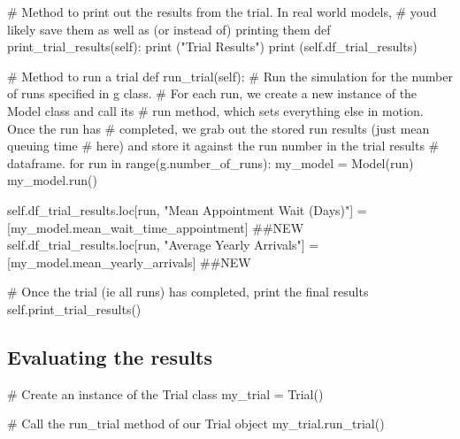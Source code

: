 \documentclass[
  letterpaper,
  DIV=11,
  numbers=noendperiod]{scrreprt}
\newenvironment{Shaded}{\begin{snugshade}}{\end{snugshade}}
\newcommand{\BuiltInTok}[1]{\textcolor[rgb]{0.00,0.23,0.31}{#1}}
\newcommand{\CommentTok}[1]{\textcolor[rgb]{0.37,0.37,0.37}{#1}}
\newcommand{\ControlFlowTok}[1]{\textcolor[rgb]{0.00,0.23,0.31}{#1}}
\newcommand{\KeywordTok}[1]{\textcolor[rgb]{0.00,0.23,0.31}{#1}}
\newcommand{\NormalTok}[1]{\textcolor[rgb]{0.00,0.23,0.31}{#1}}
\newcommand{\OperatorTok}[1]{\textcolor[rgb]{0.37,0.37,0.37}{#1}}
\newcommand{\StringTok}[1]{\textcolor[rgb]{0.13,0.47,0.30}{#1}}
\newcommand{\VariableTok}[1]{\textcolor[rgb]{0.07,0.07,0.07}{#1}}
\begin{document}
\begin{tcolorbox}
\begin{Shaded}
\begin{Highlighting}[]
    \CommentTok{\# Method to print out the results from the trial.  In real world models,}
    \CommentTok{\# you\textquotesingle{}d likely save them as well as (or instead of) printing them}
    \KeywordTok{def}\NormalTok{ print\_trial\_results(}\VariableTok{self}\NormalTok{):}
        \BuiltInTok{print}\NormalTok{ (}\StringTok{"Trial Results"}\NormalTok{)}
        \BuiltInTok{print}\NormalTok{ (}\VariableTok{self}\NormalTok{.df\_trial\_results)}

    \CommentTok{\# Method to run a trial}
    \KeywordTok{def}\NormalTok{ run\_trial(}\VariableTok{self}\NormalTok{):}
        \CommentTok{\# Run the simulation for the number of runs specified in g class.}
        \CommentTok{\# For each run, we create a new instance of the Model class and call its}
        \CommentTok{\# run method, which sets everything else in motion.  Once the run has}
        \CommentTok{\# completed, we grab out the stored run results (just mean queuing time}
        \CommentTok{\# here) and store it against the run number in the trial results}
        \CommentTok{\# dataframe.}
        \ControlFlowTok{for}\NormalTok{ run }\KeywordTok{in} \BuiltInTok{range}\NormalTok{(g.number\_of\_runs):}
\NormalTok{            my\_model }\OperatorTok{=}\NormalTok{ Model(run)}
\NormalTok{            my\_model.run()}

            \VariableTok{self}\NormalTok{.df\_trial\_results.loc[run, }\StringTok{"Mean Appointment Wait (Days)"}\NormalTok{] }\OperatorTok{=}\NormalTok{ [my\_model.mean\_wait\_time\_appointment] }\CommentTok{\#\#NEW}
            \VariableTok{self}\NormalTok{.df\_trial\_results.loc[run, }\StringTok{"Average Yearly Arrivals"}\NormalTok{] }\OperatorTok{=}\NormalTok{ [my\_model.mean\_yearly\_arrivals] }\CommentTok{\#\#NEW}

        \CommentTok{\# Once the trial (ie all runs) has completed, print the final results}
        \VariableTok{self}\NormalTok{.print\_trial\_results()}
\end{Highlighting}
\end{Shaded}

\end{tcolorbox}

\subsection{Evaluating the results}\label{evaluating-the-results}

\begin{Shaded}
\begin{Highlighting}[]
\CommentTok{\# Create an instance of the Trial class}
\NormalTok{my\_trial }\OperatorTok{=}\NormalTok{ Trial()}

\CommentTok{\# Call the run\_trial method of our Trial object}
\NormalTok{my\_trial.run\_trial()}
\end{Highlighting}
\end{Shaded}
\end{document}
